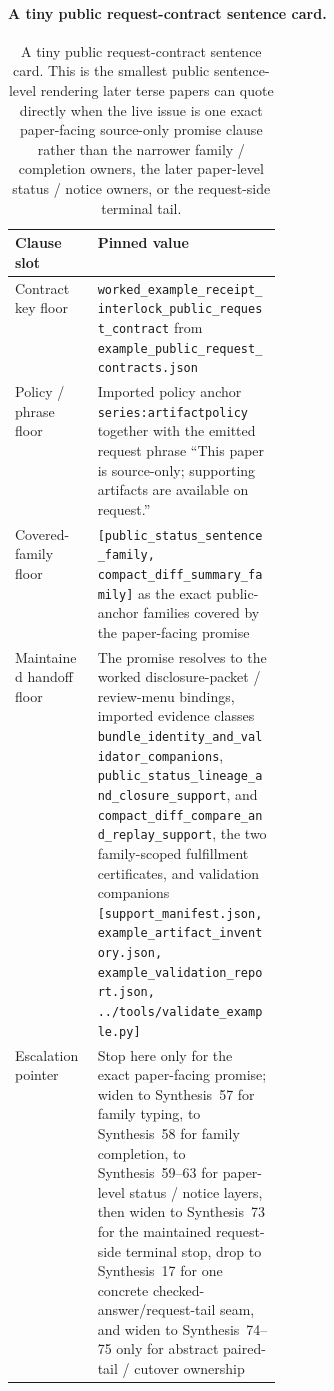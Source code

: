 \documentclass[11pt]{article}
\begin{document}
\paragraph{A tiny public request-contract sentence card.}
\begin{table}[t]
\centering
\small
\begin{tabularx}{0.97\linewidth}{@{}p{0.31\linewidth}X@{}}
\toprule
\textbf{Clause slot} & \textbf{Pinned value}\\
\midrule
Contract key floor & \nolinkurl{worked_example_receipt_interlock_public_request_contract} from \nolinkurl{example_public_request_contracts.json}\\
Policy / phrase floor & Imported policy anchor \texttt{series:artifactpolicy} together with the emitted request phrase ``This paper is source-only; supporting artifacts are available on request.''\\
Covered-family floor & \nolinkurl{[public_status_sentence_family, compact_diff_summary_family]} as the exact public-anchor families covered by the paper-facing promise\\
Maintained handoff floor & The promise resolves to the worked disclosure-packet / review-menu bindings, imported evidence classes \nolinkurl{bundle_identity_and_validator_companions}, \nolinkurl{public_status_lineage_and_closure_support}, and \nolinkurl{compact_diff_compare_and_replay_support}, the two family-scoped fulfillment certificates, and validation companions \nolinkurl{[support_manifest.json, example_artifact_inventory.json, example_validation_report.json, ../tools/validate_example.py]}\\
Escalation pointer & Stop here only for the exact paper-facing promise; widen to Synthesis~57 for family typing, to Synthesis~58 for family completion, to Synthesis~59--63 for paper-level status / notice layers, then widen to Synthesis~73 for the maintained request-side terminal stop, drop to Synthesis~17 for one concrete checked-answer/request-tail seam, and widen to Synthesis~74--75 only for abstract paired-tail / cutover ownership\\
\bottomrule
\end{tabularx}
\caption{A tiny public request-contract sentence card. This is the smallest public sentence-level rendering later terse papers can quote directly when the live issue is one exact paper-facing source-only promise clause rather than the narrower family / completion owners, the later paper-level status / notice owners, or the request-side terminal tail.}
\label{tab:tiny-public-request-contract-sentence-card}
\end{table}
\end{document}
